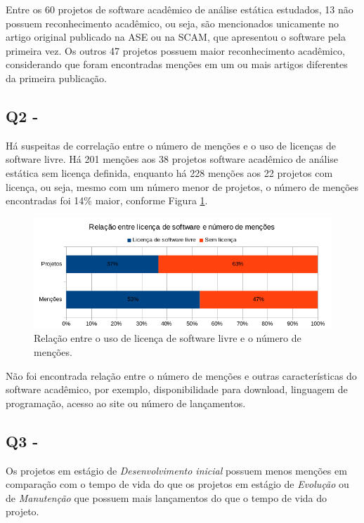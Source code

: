 Entre os 60 projetos de software acadêmico de análise estática estudados, 
13 não possuem reconhecimento acadêmico, ou seja, são
mencionados unicamente no artigo original publicado na ASE ou na SCAM,
que apresentou o software pela primeira vez. 
Os outros 47 projetos possuem maior reconhecimento acadêmico, 
considerando que foram encontradas menções em um ou mais artigos
diferentes da primeira publicação.

\subsection{Q2 - \QuestaoDois} %

Há suspeitas de correlação entre o número de menções e o uso de licenças de
software livre. 
Há 201 menções aos 38 projetos software acadêmico de análise estática sem licença definida, 
enquanto há 228 menções aos 22 projetos com licença, ou seja, 
mesmo com um número menor de projetos, o número de menções encontradas foi 14\% maior, 
conforme Figura \ref{license-vs-mentions}.

\begin{figure}[ht]
  \center
  \includegraphics[scale=0.6]{imagens/license-vs-mentions.png}
  \caption{Relação entre o uso de licença de software livre e o número de menções.}
  \label{license-vs-mentions}
\end{figure}

Não foi encontrada relação entre o número de menções e 
outras características do software acadêmico, por exemplo,
disponibilidade para download, linguagem de programação, acesso ao site ou número
de lançamentos.

\subsection{Q3 - \QuestaoTres} %

Os projetos em estágio de {\it Desenvolvimento inicial} possuem menos menções em
comparação com o tempo de vida do que os
projetos em estágio de {\it Evolução} ou de {\it Manutenção} que
possuem mais lançamentos do que o tempo de vida do projeto.

